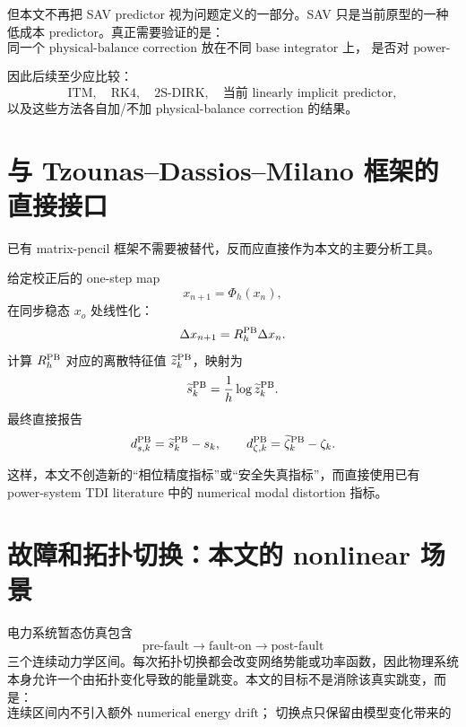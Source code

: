 \documentclass[UTF8,11pt,a4paper]{ctexart}
\begin{document}
但本文不再把 SAV predictor 视为问题定义的一部分。SAV 只是当前原型的一种
低成本 predictor。真正需要验证的是：
\[
  \boxed{
  \text{同一个 physical-balance correction 放在不同 base integrator 上，
  是否对 power-system modal distortion 有稳定而可解释的改善？}}
\]

因此后续至少应比较：
\[
  \text{ITM},\quad
  \text{RK4},\quad
  \text{2S-DIRK},\quad
  \text{当前 linearly implicit predictor},
\]
以及这些方法各自加/不加 physical-balance correction 的结果。

\section{与 Tzounas--Dassios--Milano 框架的直接接口}

已有 matrix-pencil 框架不需要被替代，反而应直接作为本文的主要分析工具。

给定校正后的 one-step map
\begin{equation}
  x_{n+1}=\Phi_h(x_n),
\end{equation}
在同步稳态 \(x_o\) 处线性化：
\begin{equation}
  \Delta x_{n+1}
  =
  R_h^{\rm PB}\Delta x_n.
\end{equation}
计算 \(R_h^{\rm PB}\) 对应的离散特征值
\(
\widetilde z_k^{\rm PB}
\)，映射为
\begin{equation}
  \widetilde s_k^{\rm PB}
  =
  \frac1h\log \widetilde z_k^{\rm PB}.
\end{equation}
最终直接报告
\begin{equation}
  d_{s,k}^{\rm PB}
  =
  \widetilde s_k^{\rm PB}-s_k,
  \qquad
  d_{\zeta,k}^{\rm PB}
  =
  \widetilde\zeta_k^{\rm PB}-\zeta_k.
\end{equation}

这样，本文不创造新的“相位精度指标”或“安全失真指标”，而直接使用已有
power-system TDI literature 中的 numerical modal distortion 指标。

\section{故障和拓扑切换：本文的 nonlinear 场景}

电力系统暂态仿真包含
\[
  \text{pre-fault}
  \rightarrow
  \text{fault-on}
  \rightarrow
  \text{post-fault}
\]
三个连续动力学区间。每次拓扑切换都会改变网络势能或功率函数，因此物理系统
本身允许一个由拓扑变化导致的能量跳变。本文的目标不是消除该真实跳变，而是：
\begin{equation}
  \boxed{
  \text{连续区间内不引入额外 numerical energy drift；
  切换点只保留由模型变化带来的 physical jump。}}
\end{equation}
\end{document}
